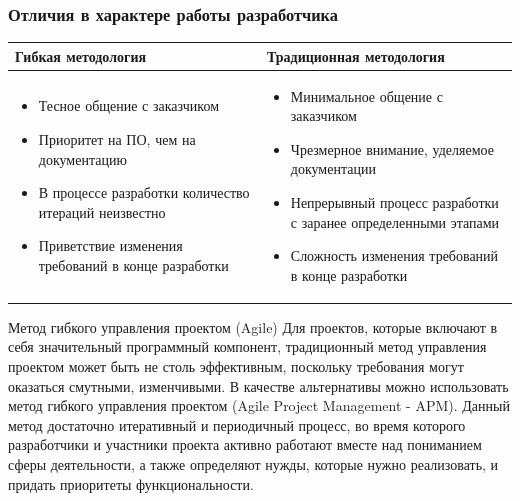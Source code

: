 \documentclass{../industrial-development}
\begin{document}
\begin{frame} \frametitle{Отличия в характере работы разработчика}

	 	\begin{table}[R]

\begin{center}
\begin{tabular}{|p{0.5\linewidth}|p{0.5\linewidth}|}
\hline
\textbf{Гибкая методология} & \textbf{Традиционная методология} \\
\hline
\begin{itemize}
\item Тесное общение с заказчиком
\item Приоритет на ПО, чем на документацию
\item В процессе разработки количество итераций неизвестно
\item Приветствие изменения требований в конце разработки
\end{itemize}
 & 
\begin{itemize}
\item Минимальное общение с заказчиком
\item Чрезмерное внимание, уделяемое документации
\item Непрерывный процесс разработки с заранее определенными этапами
\item Сложность изменения требований в конце разработки
\end{itemize} \\
\hline
\end{tabular}
\end{center}
\end{table} 
\end{frame}
\lecturenotes
	
Метод гибкого управления проектом (Agile)
Для проектов, которые включают в себя значительный программный компонент, традиционный метод управления проектом может быть не столь эффективным, поскольку требования могут оказаться смутными, изменчивыми. В качестве альтернативы можно использовать метод гибкого управления проектом (Agile Project Management - APM). Данный метод достаточно итеративный и периодичный процесс, во время которого разработчики и участники проекта активно работают вместе над пониманием сферы деятельности, а также определяют нужды, которые нужно реализовать, и придать приоритеты функциональности.
\end{document}
